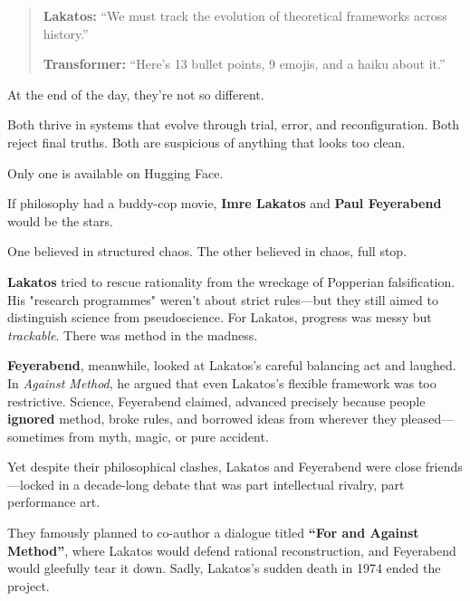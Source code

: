 \begin{quote}
\textbf{Lakatos:} “We must track the evolution of theoretical frameworks across history.”

\textbf{Transformer:} “Here's 13 bullet points, 9 emojis, and a haiku about it.”
\end{quote}

\bigskip

At the end of the day, they’re not so different.

Both thrive in systems that evolve through trial, error, and reconfiguration.  
Both reject final truths.  
Both are suspicious of anything that looks too clean.

Only one is available on Hugging Face.


\begin{tcolorbox}[colback=blue!5!white, colframe=blue!50!black, 
  title={\textbf{Historical Sidebar: Feyerabend and Lakatos — Frenemies of Scientific Method}}] 

If philosophy had a buddy-cop movie, \textbf{Imre Lakatos} and \textbf{Paul Feyerabend} would be the stars.

One believed in structured chaos. The other believed in chaos, full stop.

\bigskip

\textbf{Lakatos} tried to rescue rationality from the wreckage of Popperian falsification. His "research programmes" weren’t about strict rules—but they still aimed to distinguish science from pseudoscience. For Lakatos, progress was messy but \textit{trackable}. There was method in the madness.

\textbf{Feyerabend}, meanwhile, looked at Lakatos’s careful balancing act and laughed. In \textit{Against Method}, he argued that even Lakatos’s flexible framework was too restrictive. Science, Feyerabend claimed, advanced precisely because people \textbf{ignored} method, broke rules, and borrowed ideas from wherever they pleased—sometimes from myth, magic, or pure accident.

\bigskip

Yet despite their philosophical clashes, Lakatos and Feyerabend were close friends—locked in a decade-long debate that was part intellectual rivalry, part performance art.

They famously planned to co-author a dialogue titled \textbf{“For and Against Method”}, where Lakatos would defend rational reconstruction, and Feyerabend would gleefully tear it down. Sadly, Lakatos’s sudden death in 1974 ended the project.


\end{tcolorbox}

